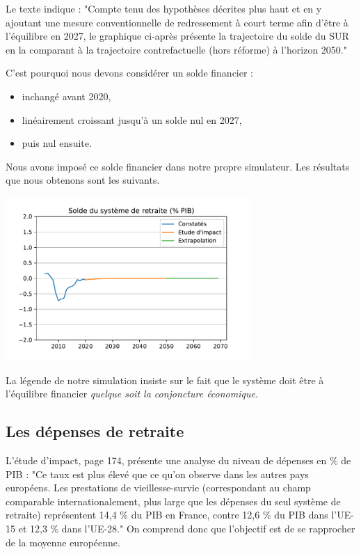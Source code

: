 \documentclass[10pt]{article}
\begin{document}
Le texte indique : "Compte tenu des hypothèses décrites plus haut 
et en y ajoutant une mesure conventionnelle de redressement à court 
terme afin d’être à l’équilibre en 2027, le graphique ci-après présente 
la trajectoire du solde du SUR en la comparant à la trajectoire 
contrefactuelle (hors réforme) à l’horizon 2050."

C'est pourquoi nous devons considérer un solde financier :
\begin{itemize}
\item inchangé avant 2020,
\item linéairement croissant jusqu'à un solde nul en 2027,
\item puis nul ensuite.
\end{itemize}

Nous avons imposé ce solde financier dans notre propre simulateur. 
Les résultats que nous obtenons sont les suivants. 

\begin{center}
\includegraphics[width=0.7\textwidth]{Simulation-Solde-Financier.pdf}
\end{center}

La légende de notre simulation insiste sur le fait que 
le système doit être à l'équilibre financier \emph{quelque soit la 
conjoncture économique}. 


\subsection{Les dépenses de retraite}

L'étude d'impact, page 174, présente une analyse du niveau de dépenses 
en \% de PIB : "Ce taux est plus élevé que ce qu’on observe dans 
les autres pays européens. Les prestations de vieillesse-survie 
(correspondant au champ comparable internationalement, plus 
large que les dépenses du seul système de retraite) représentent 
14,4 \% du PIB en France, contre 12,6 \% du PIB dans l’UE-15 et 12,3 \% dans l’UE-28."
On comprend donc que l'objectif est de se rapprocher de la moyenne européenne. 
\end{document}
